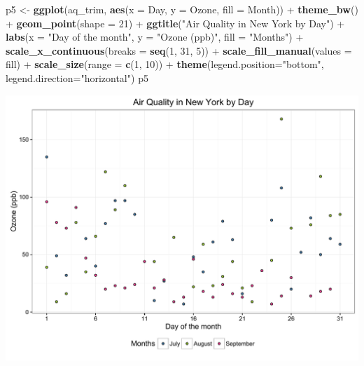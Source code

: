 \documentclass[]{article}
\newenvironment{Shaded}{\begin{snugshade}}{\end{snugshade}}
\newcommand{\KeywordTok}[1]{\textcolor[rgb]{0.13,0.29,0.53}{\textbf{{#1}}}}
\newcommand{\DataTypeTok}[1]{\textcolor[rgb]{0.13,0.29,0.53}{{#1}}}
\newcommand{\DecValTok}[1]{\textcolor[rgb]{0.00,0.00,0.81}{{#1}}}
\newcommand{\StringTok}[1]{\textcolor[rgb]{0.31,0.60,0.02}{{#1}}}
\newcommand{\NormalTok}[1]{{#1}}
\begin{document}
\begin{Shaded}
\begin{Highlighting}[]
\NormalTok{p5 <-}\StringTok{ }\KeywordTok{ggplot}\NormalTok{(aq_trim, }\KeywordTok{aes}\NormalTok{(}\DataTypeTok{x =} \NormalTok{Day, }\DataTypeTok{y =} \NormalTok{Ozone, }\DataTypeTok{fill =} \NormalTok{Month)) +}\StringTok{ }\KeywordTok{theme_bw}\NormalTok{() +}
\StringTok{      }\KeywordTok{geom_point}\NormalTok{(}\DataTypeTok{shape =} \DecValTok{21}\NormalTok{) +}
\StringTok{      }\KeywordTok{ggtitle}\NormalTok{(}\StringTok{"Air Quality in New York by Day"}\NormalTok{) +}\StringTok{ }
\StringTok{      }\KeywordTok{labs}\NormalTok{(}\DataTypeTok{x =} \StringTok{"Day of the month"}\NormalTok{, }\DataTypeTok{y =} \StringTok{"Ozone (ppb)"}\NormalTok{, }\DataTypeTok{fill =} \StringTok{"Months"}\NormalTok{) +}
\StringTok{      }\KeywordTok{scale_x_continuous}\NormalTok{(}\DataTypeTok{breaks =} \KeywordTok{seq}\NormalTok{(}\DecValTok{1}\NormalTok{, }\DecValTok{31}\NormalTok{, }\DecValTok{5}\NormalTok{)) +}
\StringTok{      }\KeywordTok{scale_fill_manual}\NormalTok{(}\DataTypeTok{values =} \NormalTok{fill) +}
\StringTok{      }\KeywordTok{scale_size}\NormalTok{(}\DataTypeTok{range =} \KeywordTok{c}\NormalTok{(}\DecValTok{1}\NormalTok{, }\DecValTok{10}\NormalTok{)) +}
\StringTok{      }\KeywordTok{theme}\NormalTok{(}\DataTypeTok{legend.position=}\StringTok{"bottom"}\NormalTok{, }\DataTypeTok{legend.direction=}\StringTok{"horizontal"}\NormalTok{)}
\NormalTok{p5}
\end{Highlighting}
\end{Shaded}

\begin{center}\includegraphics{0_all_posts_pdf/scatter_12-1} \end{center}
\end{document}
